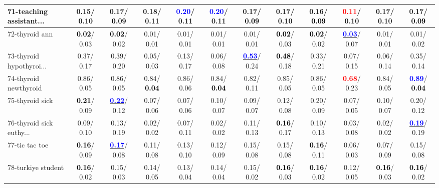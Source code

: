 \begin{table}[h]
\begin{center}
{\begin{tabular}{lc|c|c|c|c|c|c|c|c|c|c}
71-teaching assistant... &   0.15/  0.10 &   0.17/\textcolor{black}{\textbf{  0.09}} &   0.18/  0.11 & \textcolor{blue}{\textbf{  0.20}}/  0.11 & \textcolor{blue}{\textbf{  0.20}}/  0.11 &   0.17/\textcolor{black}{\textbf{  0.09}} &   0.17/  0.10 &   0.16/\textcolor{black}{\textbf{  0.09}} & \textcolor{red}{\textbf{  0.11}}/  0.10 &   0.17/  0.10 &   0.17/\textcolor{black}{\textbf{  0.09}} \\ \hline
72-thyroid ann & \textcolor{black}{\textbf{  0.02}}/  0.03 & \textcolor{black}{\textbf{  0.02}}/  0.02 &   0.01/  0.01 &   0.01/  0.01 &   0.01/  0.01 &   0.01/  0.01 & \textcolor{black}{\textbf{  0.02}}/  0.03 & \textcolor{black}{\textbf{  0.02}}/  0.02 & \underline{\textcolor{blue}{\textbf{  0.03}}}/  0.07 &   0.01/  0.01 &   0.01/  0.02 \\
73-thyroid hypothyroi... &   0.37/  0.17 &   0.39/  0.20 &   0.05/  0.03 &   0.13/  0.17 &   0.06/  0.08 & \underline{\textcolor{blue}{\textbf{  0.53}}}/  0.24 & \textcolor{black}{\textbf{  0.48}}/  0.18 &   0.33/  0.21 &   0.07/  0.15 &   0.06/  0.14 &   0.35/  0.14 \\
74-thyroid newthyroid &   0.86/  0.05 &   0.86/  0.05 &   0.84/\textcolor{black}{\textbf{  0.04}} &   0.86/  0.06 &   0.84/\textcolor{black}{\textbf{  0.04}} &   0.82/  0.11 &   0.85/  0.05 &   0.86/  0.05 & \textcolor{red}{\textbf{  0.68}}/  0.23 &   0.84/  0.05 & \textcolor{blue}{\textbf{  0.89}}/\textcolor{black}{\textbf{  0.04}} \\
75-thyroid sick & \textcolor{black}{\textbf{  0.21}}/  0.09 & \underline{\textcolor{blue}{\textbf{  0.22}}}/  0.12 &   0.07/  0.06 &   0.07/  0.06 &   0.10/  0.07 &   0.09/  0.07 &   0.12/  0.08 &   0.20/  0.09 &   0.07/  0.05 &   0.10/  0.07 &   0.20/  0.12 \\
76-thyroid sick euthy... &   0.09/  0.10 &   0.13/  0.19 &   0.02/  0.02 &   0.07/  0.11 &   0.02/  0.02 &   0.11/  0.13 & \textcolor{black}{\textbf{  0.16}}/  0.17 &   0.10/  0.13 &   0.03/  0.08 &   0.02/  0.02 & \underline{\textcolor{blue}{\textbf{  0.19}}}/  0.19 \\
77-tic tac toe & \textcolor{black}{\textbf{  0.16}}/  0.09 & \underline{\textcolor{blue}{\textbf{  0.17}}}/  0.08 &   0.11/  0.08 &   0.13/  0.10 &   0.12/  0.09 &   0.15/  0.08 &   0.15/  0.08 & \textcolor{black}{\textbf{  0.16}}/  0.11 &   0.06/  0.03 &   0.07/  0.09 &   0.15/  0.08 \\
78-turkiye student & \textcolor{black}{\textbf{  0.16}}/  0.02 &   0.15/  0.03 &   0.14/  0.05 &   0.13/  0.04 &   0.14/  0.04 &   0.15/  0.02 & \textcolor{black}{\textbf{  0.16}}/  0.03 & \textcolor{black}{\textbf{  0.16}}/  0.02 &   0.12/  0.05 & \textcolor{black}{\textbf{  0.16}}/  0.03 & \textcolor{black}{\textbf{  0.16}}/  0.02 \\ \hline

\end{tabular}}
\end{center}
\end{table}
